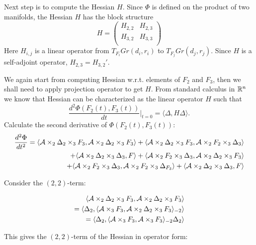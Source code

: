 Next step is to compute the Hessian $H$. Since $\Phi$ is defined on the product
of two manifolds, the Hessian $H$ has the block structure
\begin{equation}
    H = \begin{pmatrix}
        H_{2,2} & H_{2,3} \\
        H_{3,2} & H_{3,3} \\
    \end{pmatrix}
\end{equation}
Here $H_{i,j}$ is a linear operator from $T_{F_i}Gr(d_i, r_i)$ to $T_{F_j}Gr(d_j, r_j)$.
Since $H$ is a self-adjoint operator, $H_{2,3} = H_{3,2}'$.


We again start from computing Hessian
w.r.t. elements of $F_2$ and $F_3$, then we shall need to apply projection 
operator to get $H$. From standard calculus in $\mathbb{R}^n$ we know that
Hessian can be characterized as the linear operator $H$ such that
\begin{equation}
\frac{d^2 \Phi(F_2(t), F_3(t))}{dt} \rvert_{t = 0} = \langle \Delta, H \Delta \rangle.
\end{equation}
Calculate the second derivative of $\Phi(F_2(t), F_3(t))$:
\begin{eqnarray*}
\frac{d^2 \Phi}{dt^2} = \langle \mathcal{A} \times_2 \Delta{_2} \times_3 {F_3}, \mathcal{A} \times_2 \Delta{_2} \times_3 {F_3} \rangle 
+ \langle \mathcal{A} \times_2 \Delta{_2} \times_3 {F_3}, \mathcal{A} \times_2 {F_2} \times_3 \Delta{_3} \rangle \\
+ \langle \mathcal{A} \times_2 \Delta{_2} \times_3 \Delta{_3}, F \rangle 
+ \langle \mathcal{A} \times_2 {F_2} \times_3 \Delta{_3}, \mathcal{A} \times_2 \Delta{_2} \times_3 {F_3} \rangle \\ 
+ \langle \mathcal{A} \times_2 {F_2} \times_3 \Delta{_3}, \mathcal{A} \times_2 {F_2}  \times_3 \Delta_{F_3} \rangle 
+ \langle \mathcal{A} \times_2 \Delta{_2} \times_3 \Delta{_3}, F \rangle 
\end{eqnarray*}

Consider the $(2,2)$-term:

\begin{eqnarray*}
\langle \mathcal{A} \times_2 \Delta{_2} \times_3 {F_3}, \mathcal{A} \times_2 \Delta{_2} \times_3 {F_3} \rangle \\
= \langle \Delta{_2}, \langle \mathcal{A} \times_3 {F_3}, \mathcal{A} \times_2 \Delta{_2} \times_3 {F_3} \rangle_{-2} \rangle \\
 = \langle \Delta{_2}, \langle \mathcal{A} \times_3 {F_3}, \mathcal{A}  \times_3 {F_3} \rangle_{-2} \Delta{_2} \rangle
\end{eqnarray*}

This gives the $(2,2)$-term of the Hessian in operator form:

